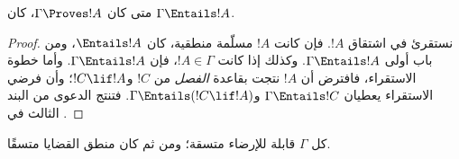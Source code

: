 \documentclass[../../../include/open-logic-section]{subfiles}
\begin{document}


\begin{thm}[السلامة] 
متى كان $\Gamma\Proves!A$، كان
$\Gamma \Entails !A$. 
\end{thm}

\begin{proof} 
نستقرئ في اشتقاق $!A$. فإن كانت $!A$ مسلّمة منطقية، كان $\Entails
!A$، ومن باب أولى $\Gamma \Entails!A$. وكذلك إذا كانت $!A \in \Gamma$،
فإن $\Gamma \Entails!A$. وأما خطوة الاستقراء، فافترض أن $!A$ نتجت بقاعدة
\emph{الفصل} من $!C$ و$!C\lif!A$؛ وأن فرضي الاستقراء يعطيان
$\Gamma \Entails !C$ و$\Gamma \Entails (!C\lif !A)$. فتنتج الدعوى من
البند الثالث في . 
\end{proof}

\begin{cor} 
كل $\Gamma$ قابلة للإرضاء متسقة؛ ومن ثم كان منطق القضايا متسقًا. 
\end{cor}
\end{document}
